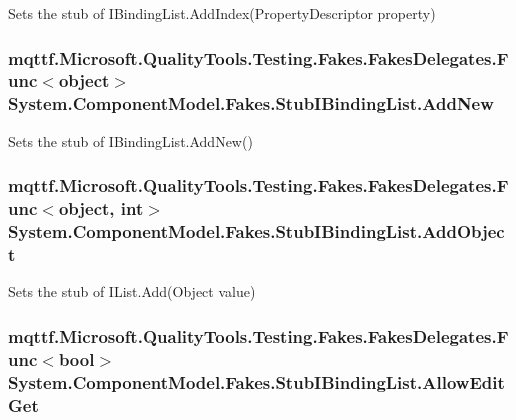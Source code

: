 Sets the stub of I\-Binding\-List.\-Add\-Index(\-Property\-Descriptor property)

\hypertarget{class_system_1_1_component_model_1_1_fakes_1_1_stub_i_binding_list_a301bdf27264f4bcd26792270273479b8}{
\subsubsection[{Add\-New}]{\setlength{\rightskip}{0pt plus 5cm}mqttf.\-Microsoft.\-Quality\-Tools.\-Testing.\-Fakes.\-Fakes\-Delegates.\-Func$<$object$>$ System.\-Component\-Model.\-Fakes.\-Stub\-I\-Binding\-List.\-Add\-New}}\label{class_system_1_1_component_model_1_1_fakes_1_1_stub_i_binding_list_a301bdf27264f4bcd26792270273479b8}


Sets the stub of I\-Binding\-List.\-Add\-New()

\hypertarget{class_system_1_1_component_model_1_1_fakes_1_1_stub_i_binding_list_a5ea6df468fc86ac511f72362fac11a41}{
\subsubsection[{Add\-Object}]{\setlength{\rightskip}{0pt plus 5cm}mqttf.\-Microsoft.\-Quality\-Tools.\-Testing.\-Fakes.\-Fakes\-Delegates.\-Func$<$object, int$>$ System.\-Component\-Model.\-Fakes.\-Stub\-I\-Binding\-List.\-Add\-Object}}\label{class_system_1_1_component_model_1_1_fakes_1_1_stub_i_binding_list_a5ea6df468fc86ac511f72362fac11a41}


Sets the stub of I\-List.\-Add(\-Object value)

\hypertarget{class_system_1_1_component_model_1_1_fakes_1_1_stub_i_binding_list_a263d5f06880e9708e7e7304c7ebd0c87}{
\subsubsection[{Allow\-Edit\-Get}]{\setlength{\rightskip}{0pt plus 5cm}mqttf.\-Microsoft.\-Quality\-Tools.\-Testing.\-Fakes.\-Fakes\-Delegates.\-Func$<$bool$>$ System.\-Component\-Model.\-Fakes.\-Stub\-I\-Binding\-List.\-Allow\-Edit\-Get}}\label{class_system_1_1_component_model_1_1_fakes_1_1_stub_i_binding_list_a263d5f06880e9708e7e7304c7ebd0c87}


